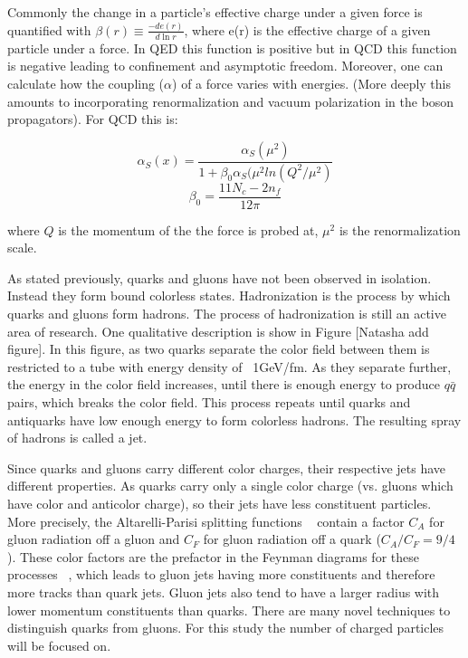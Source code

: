 Commonly the change in a particle's effective charge under a given force is quantified with  $\beta(r) \equiv \frac{-de(r)}{d\ln r}$, where e(r) is the effective charge of a given particle under a force. In QED this function is positive but in QCD this function is negative leading to confinement and asymptotic freedom. Moreover, one can calculate how the coupling ($\alpha$) of a force varies with energies. (More deeply this amounts to incorporating renormalization and vacuum polarization in the boson propagators). For QCD this is:

\begin{equation}
\alpha_{S}(x) = \frac{\alpha_{S}(\mu^{2})}{1+\beta_{0}\alpha_{S}(\mu^{2}ln(Q^{2}/\mu^{2})}
\end{equation}
\begin{equation}
\beta_{0} = \frac{11N_{c}-2n_{f}}{12\pi}
\end{equation}

where $Q$ is the momentum of the the force is probed at, $\mu^{2}$ is the renormalization scale.

As stated previously, quarks and gluons have not been observed in isolation. Instead they form bound colorless states. Hadronization is the process by which quarks and gluons form hadrons. The process of hadronization is still an active area of research. One qualitative description is show in Figure [Natasha add figure]. In this figure, as two quarks separate the color field between them is restricted to a tube with energy density of ~1GeV/fm. As they separate further, the energy in the color field increases, until there is enough energy to produce $q\bar{q}$ pairs, which breaks the color field. This process repeats until quarks and antiquarks have low enough energy to form colorless hadrons. The resulting spray of hadrons is called a jet.

Since quarks and gluons carry different color charges, their respective jets have different properties. As quarks carry only a single color charge (vs. gluons which have color and anticolor charge), so their jets have less constituent particles. More precisely, the Altarelli-Parisi splitting functions ~\cite{altarelli} contain a factor $C_{A}$ for gluon radiation off a gluon and $C_{F}$ for gluon radiation off a quark ($C_{A}/C_{F} = 9/4$). These color factors are the prefactor in the Feynman diagrams for these processes ~\cite{colorfactor}, which leads to gluon jets having more constituents and therefore more tracks than quark jets. Gluon jets also tend to have a larger radius with lower momentum constituents than quarks. There are many novel techniques to distinguish quarks from gluons. For this study the number of charged particles will be focused on.  

